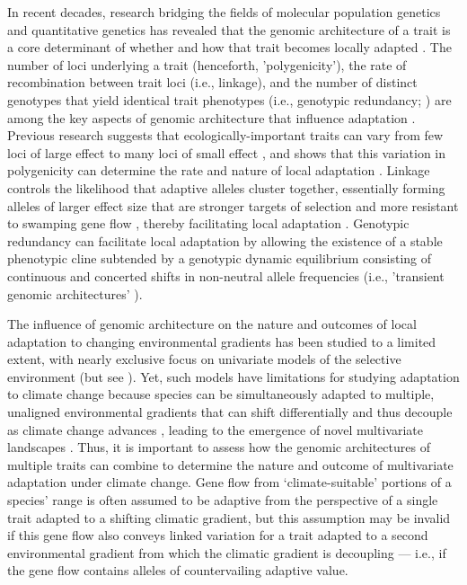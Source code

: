 \documentclass[9pt,twocolumn,twoside,lineno]{pnas-new}
\begin{document}
In recent decades, research bridging the fields
of molecular population genetics
and quantitative genetics
\cite{barghi_polygenic,barton,pritchard_human_adaptation,pritchard_sweeps_alone}
has revealed that the genomic architecture of a trait
is a core determinant of whether and how that trait
becomes locally adapted \cite{yeaman_review}.
The number of loci underlying a trait (henceforth, 'polygenicity'),
the rate of recombination between trait loci (i.e., linkage),
and the number of distinct genotypes that yield identical trait phenotypes
(i.e., genotypic redundancy; \cite{yeaman_review,laruson,barghi_polygenic})
are among the key aspects of genomic architecture that influence adaptation
\cite{barton,yeaman_whitlock,yeaman_review,lecorre}.
Previous research suggests that ecologically-important traits can vary from
few loci of large effect \cite{martin,rees}
to many loci of small effect \cite{boyle,rockman,savolainen,sella,barghi_polygenic},
and shows that this variation in polygenicity can
determine the rate and nature of local adaptation \cite{yeaman_amnat}. 
Linkage controls the likelihood that adaptive alleles cluster together,
essentially forming alleles of larger effect size that are stronger 
targets of selection and more resistant
to swamping gene flow \cite{yeaman_whitlock},
thereby facilitating local adaptation \cite{tigano}.
Genotypic redundancy can facilitate local adaptation 
by allowing the existence of a stable phenotypic cline
subtended by a genotypic dynamic equilibrium
consisting of continuous and concerted shifts in non-neutral allele frequencies
(i.e., 'transient genomic architectures' \cite{barghi_redundancy,manceau,yeaman_amnat}).

The influence of genomic architecture on the nature and outcomes
of local adaptation to changing environmental gradients
has been studied to a limited extent,
with nearly exclusive focus on univariate models
of the selective environment (but see \cite{schiffers}).
Yet, such models have limitations for studying adaptation to climate change
because species can be simultaneously adapted to multiple,
unaligned environmental gradients \cite{guillaume} that can shift differentially
and thus decouple as climate change advances
\cite{crimmins,daly},
leading to the emergence of novel multivariate landscapes
\cite{williams_novel_climates,williams_projected_novel_disappearing,fitzpatrick}.
Thus, it is important to assess how the genomic architectures
of multiple traits can combine to determine the nature and outcome
of multivariate adaptation under climate change.
Gene flow from `climate-suitable' portions of a species' range
is often assumed to be adaptive from the perspective of a single trait
adapted to a shifting climatic gradient, but this assumption
may be invalid if this gene flow also conveys
linked variation for a trait
adapted to a second environmental gradient
from which the climatic gradient is decoupling --- i.e.,
if the gene flow contains alleles of countervailing adaptive value.
\end{document}
